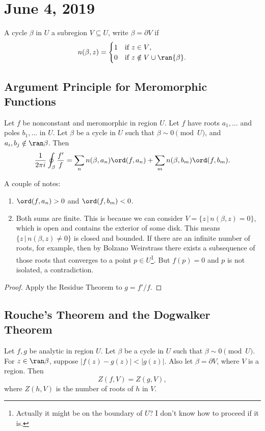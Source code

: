 \section{June 4, 2019}
\begin{definition}
    A cycle $\beta$ in $U$  a subregion $V \subseteq U$,
    write $\beta = \partial V$ if
    \[ n(\beta, z) = 
        \begin{cases} 1 & \text{if $z \in V$}, \\
            0 & \text{if $z \notin V \cup \ran{\beta}$}.
        \end{cases}
        \]
\end{definition}

\subsection{Argument Principle for Meromorphic Functions}
\begin{theorem}
    Let $f$ be nonconstant and meromorphic in region $U$.
    Let $f$ have roots $a_1, \ldots$ and poles $b_1, \ldots$ in $U$.
    Let $\beta$ be a cycle in $U$ such that $\beta \sim 0 \pmod{U}$,
    and $a_i, b_j \notin \ran \beta$.
    Then
    \[ \frac{1}{2\pi i} \oint_{\beta} \frac{f'}{f} = \sum_n n(\beta, a_n)
    \ord (f, a_n) + \sum_{m} n(\beta, b_m) \ord(f, b_m). \]
\end{theorem}
A couple of notes:
\begin{enumerate}
    \item $\ord(f, a_n) > 0$ and $\ord (f, b_m) < 0$.
    \item Both sums are finite.  This is because we can consider
        $V = \{z \, | \, n(\beta, z) = 0\}$, which is open and contains
        the exterior of some disk.
        This means $\{z \, | \, n(\beta, z) \ne 0\}$ is closed and bounded.
        If there are an infinite number of roots, for example, then
        by Bolzano Weirstrass there exists a subsequence of those roots
        that converges to a point $p \in U$\footnote{Actually it might be on the boundary of $U$?  I don't know how to proceed if it is.}.  
        But $f(p) = 0$ and $p$
        is not isolated, a contradiction.
\end{enumerate}

\begin{proof}
    Apply the Residue Theorem to $g = f'/f$.
\end{proof}

\subsection{Rouche's Theorem and the Dogwalker Theorem}
\begin{theorem}
    Let $f, g$ be analytic in region $U$.
    Let $\beta$ be a cycle in $U$ such that $\beta \sim 0 \pmod{U}$.
    For $z \in \ran \beta$, suppose $|f(z)-g(z)| < |g(z)|$.
    Also let $\beta = \partial V$, where $V$ is a region.
    Then
    \[ Z(f, V) = Z(g, V), \]
    where $Z(h, V)$ is the number of roots of $h$ in $V$.
\end{theorem}

